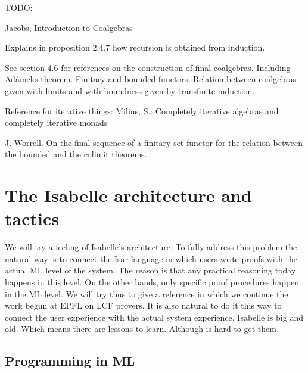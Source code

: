 \documentclass[a4paper,12pt]{article}
\theoremstyle{break}
\theoremstyle{break}
\begin{document}
\makeatletter\renewcommand{\ALG@name}{Algoritmo}

\maketitle



\newpage
\tableofcontents
\newpage

TODO:

Jacobs, Introduction to Coalgebras 

Explains in proposition 2.4.7 how recursion is obtained from induction.

See section 4.6 for references on the construction of final coalgebras. Including Adámeks theorem. Finitary and bounded functors. Relation between coalgebras given with limits and with boundness given by transfinite induction.

Reference for iterative things: Milius, S.: Completely iterative algebras and completely iterative monads

 J. Worrell. On the final sequence of a finitary set functor for the relation between the bounded and the colimit theorems.
 

 
 
\section{The Isabelle architecture and tactics}

We will try a feeling of Isabelle's architecture. To fully address this problem the natural way is to connect the Isar language in which users write proofs with the actual ML level of the system. The reason is that any practical reasoning today happens in this level. On the other hands, only specific proof procedures happen in the ML level. We will try thus to give a reference in which we continue the work begun at EPFL on LCF provers. It is also natural to do it this way to connect the user experience with the actual system experience. Isabelle is big and old. Which means there are lessons to learn. Although is hard to get them.

\subsection{Programming in ML}
\end{document}
